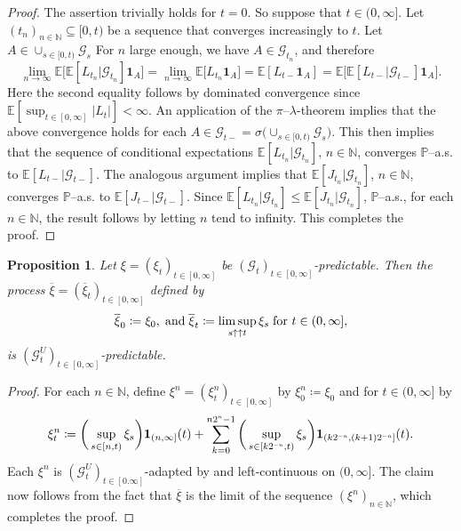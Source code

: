 \documentclass[10pt]{article} %
\newtheorem{proposition}[theorem]{Proposition}
\newcommand\cG{\mathcal G}
\newcommand{\smalltext}[1]{\text{\fontsize{4}{4}\selectfont$#1$}}
\def \E{\mathbb{E}}
\def \N{\mathbb{N}}
\def \P{\mathbb{P}}
\begin{document}
\begin{proof}
	The assertion trivially holds for $t = 0$. So suppose that $t \in (0,\infty]$. Let $(t_n)_{n \in \N} \subseteq [0,t)$ be a sequence that converges increasingly to $t$. Let $A \in \cup_{s \in [0,t)} \cG_s$ For $n$ large enough, we have $A \in \cG_{t_n}$, and therefore
	\begin{equation*}
		\lim_{n \rightarrow \infty} \E\Big[\E[ L_{t_n} | \cG_{t_n}] \mathbf{1}_A\Big] = \lim_{n \rightarrow \infty} \E\Big[L_{t_n} \mathbf{1}_A\Big] = \E[L_{t-}\mathbf{1}_A] = \E\big[\E[L_{t-}|\cG_{t-}] \mathbf{1}_A\big].
	\end{equation*}
	Here the second equality follows by dominated convergence since $\E[\sup_{t \in [0,\infty]}|L_t|] < \infty$. An application of the $\pi$--$\lambda$-theorem implies that the above convergence holds for each $A \in \cG_{t-} = \sigma\big(\cup_{s \in [0,t)}\cG_s\big)$. This then implies that the sequence of conditional expectations $\E[L_{t_n}|\cG_{t_n}]$, $n \in \N$, converges $\P$--a.s. to $\E[L_{t-}| \cG_{t-}]$. The analogous argument implies that $\E[J_{t_n}|\cG_{t_n}]$, $n \in \N$, converges $\P$--a.s. to $\E[J_{t-}| \cG_{t-}]$. Since $\E[L_{t_n}| \cG_{t_n}] \leq \E[J_{t_n}| \cG_{t_n}]$, $\P$--a.s., for each $n \in \N$, the result follows by letting $n$ tend to infinity. This completes the proof.
\end{proof}

\begin{proposition}\label{prop::pred_left_limit}
	Let $\xi = (\xi_t)_{t \in [0,\infty]}$ be $(\cG_t)_{t \in [0,\infty]}$-predictable. Then the process $\overline\xi = (\overline\xi_t)_{t \in [0,\infty]}$ defined by
\begin{equation*}
	\overline\xi_0 \coloneqq \xi_0, \; \text{\rm and} \; \overline\xi_t \coloneqq \limsup_{s \uparrow\uparrow t} \xi_s \; \text{\rm for $t \in (0,\infty]$},
\end{equation*}
is $(\cG^U_t)_{t \in [0,\infty]}$-predictable.
\end{proposition}

\begin{proof}
	For each $n \in \mathbb{N}$, define $\xi^n = (\xi^n_t)_{t \in [0,\infty]}$ by $\xi^n_0 \coloneqq \xi_0$ and for $t \in (0,\infty]$ by
	\begin{equation*}
		\xi^n_t \coloneqq \bigg(\sup_{s \in [n,t)} \xi_s \bigg)\mathbf{1}_{(n,\infty]}(t) + \sum_{k = 0}^{n2^\smalltext{n}-1} \bigg(\sup_{s \in [k2^{\smalltext{-}\smalltext{n}},t)}\xi_s\bigg) \mathbf{1}_{(k2^{\smalltext{-}\smalltext{n}}, (k+1)2^{\smalltext{-}\smalltext{n}}]}(t).
	\end{equation*}
	Each $\xi^n$ is $(\cG^U_t)_{t \in [0.\infty]}$-adapted by \cite[Proposition 2.21]{karoui2013capacities} and left-continuous on $(0,\infty]$. The claim now follows from the fact that $\overline\xi$ is the limit of the sequence $(\xi^n)_{n \in \N}$, which completes the proof.
\end{proof}
\end{document}
